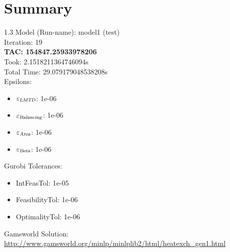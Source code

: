 \documentclass{article}%
\begin{document}
%
\normalsize%
\section{Summary}%
\thispagestyle{plain}%
\begin{spacing}{1.3}%
\Large%
Model (Run-name): model1 (test)\\%
Iteration: 19\\%
\textbf{TAC: 154847.25933978206}\\%
Took: 2.1518211364746094s\\%
Total Time: 29.079179048538208s\\%
Epsilons:%
\begin{itemize}%
	\item $\varepsilon_{\textsl{LMTD}}$: 1e-06%
	\item $\varepsilon_{\textsl{Balancing}}$: 1e-06%
	\item $\varepsilon_{\textsl{Area}}$: 1e-06%
	\item $\varepsilon_{\textsl{Beta}}$: 1e-06%
\end{itemize}%
Gurobi Tolerances:%
\begin{itemize}%
	\item IntFeasTol: 1e-05%
	\item FeasibilityTol: 1e-06%
	\item OptimalityTol: 1e-06%
\end{itemize}%
\end{spacing}%
\normalsize%
Gamsworld Solution: \url{http://www.gamsworld.org/minlp/minlplib2/html/heatexch_gen1.html}%
%
\clearpage%
\end{document}

